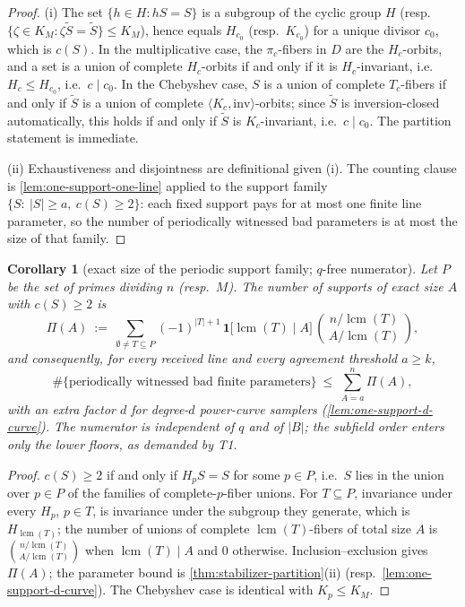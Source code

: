 \documentclass[11pt]{article}
\newtheorem{corollary}[theorem]{Corollary}
\theoremstyle{definition}
\theoremstyle{remark}
\newcommand{\B}{B}
\begin{document}
\begin{proof}
(i) The set $\{h\in H:hS=S\}$ is a subgroup of the cyclic group $H$ (resp.\ $\{\zeta\in K_M:\zeta\widetilde S=\widetilde S\}\le K_M$), hence equals $H_{c_0}$ (resp.\ $K_{c_0}$) for a unique divisor $c_0$, which is $c(S)$. In the multiplicative case, the $\pi_c$-fibers in $D$ are the $H_c$-orbits, and a set is a union of complete $H_c$-orbits if and only if it is $H_c$-invariant, i.e.\ $H_c\le H_{c_0}$, i.e.\ $c\mid c_0$. In the Chebyshev case, $S$ is a union of complete $T_c$-fibers if and only if $\widetilde S$ is a union of complete $\langle K_c,\mathrm{inv}\rangle$-orbits; since $\widetilde S$ is inversion-closed automatically, this holds if and only if $\widetilde S$ is $K_c$-invariant, i.e.\ $c\mid c_0$. The partition statement is immediate.

(ii) Exhaustiveness and disjointness are definitional given (i). The counting clause is \cref{lem:one-support-one-line} applied to the support family $\{S:\ |S|\ge a,\ c(S)\ge2\}$: each fixed support pays for at most one finite line parameter, so the number of periodically witnessed bad parameters is at most the size of that family.
\end{proof}

\begin{corollary}[exact size of the periodic support family; $q$-free numerator]\label{cor:periodic-support-count}
Let $P$ be the set of primes dividing $n$ \textup(resp.\ $M$\textup). The number of supports of exact size $A$ with $c(S)\ge2$ is
\[
\Pi(A)\ :=\ \sum_{\emptyset\ne T\subseteq P}(-1)^{|T|+1}\,
\mathbf 1\bigl[\operatorname{lcm}(T)\mid A\bigr]\,
\binom{\,n/\operatorname{lcm}(T)\,}{\,A/\operatorname{lcm}(T)\,},
\]
and consequently, for every received line and every agreement threshold $a\ge k$,
\[
\#\{\text{periodically witnessed bad finite parameters}\}\ \le\ \sum_{A=a}^{n}\Pi(A),
\]
with an extra factor $d$ for degree-$d$ power-curve samplers \textup(\cref{lem:one-support-d-curve}\textup). The numerator is independent of $q$ and of $|\B|$; the subfield order enters only the lower floors, as demanded by T1.
\end{corollary}

\begin{proof}
$c(S)\ge2$ if and only if $H_pS=S$ for some $p\in P$, i.e.\ $S$ lies in the union over $p\in P$ of the families of complete-$p$-fiber unions. For $T\subseteq P$, invariance under every $H_p$, $p\in T$, is invariance under the subgroup they generate, which is $H_{\operatorname{lcm}(T)}$; the number of unions of complete $\operatorname{lcm}(T)$-fibers of total size $A$ is $\binom{n/\operatorname{lcm}(T)}{A/\operatorname{lcm}(T)}$ when $\operatorname{lcm}(T)\mid A$ and $0$ otherwise. Inclusion--exclusion gives $\Pi(A)$; the parameter bound is \cref{thm:stabilizer-partition}(ii) \textup(resp.\ \cref{lem:one-support-d-curve}\textup). The Chebyshev case is identical with $K_p\le K_M$.
\end{proof}
\end{document}

